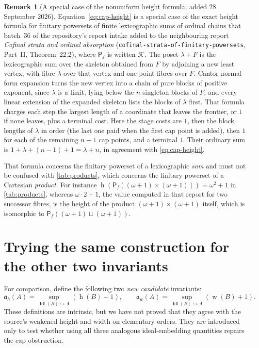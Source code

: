 \documentclass[11pt,letterpaper]{article}
\theoremstyle{teal}
\theoremstyle{definition}
\newtheorem{remark}[theorem]{Remark}
\newcommand{\Pf}{\mathsf P_{\!f}}
\newcommand{\Idl}{\operatorname{Idl}}
\newcommand{\hgt}{\operatorname{h}}
\newcommand{\wid}{\operatorname{w}}
\newcommand{\ah}{\mathfrak a_h}
\newcommand{\aw}{\mathfrak a_w}
\newcommand{\emb}{\hookrightarrow}
\begin{document}
\begin{remark}[A special case of the nonuniform height formula; added 28 September 2026]\label{ioa:rem:nonuniform-heights}
Equation~\eqref{eq:cap-height} is a special case of the exact height formula for finitary powersets of finite lexicographic sums of ordinal chains that batch~36 of the repository's report intake added to the neighbouring report \emph{Cofinal strata and ordinal absorption} (\texttt{cofinal-strata-of-finitary-powersets}, Part~II, Theorem~22.2), where $\Pf$ is written $\mathcal K$. The poset $\lambda+F$ is the lexicographic sum over the skeleton obtained from $F$ by adjoining a new least vertex, with fibre $\lambda$ over that vertex and one-point fibres over $F$. Cantor-normal-form expansion turns the new vertex into a chain of pure blocks of positive exponent, since $\lambda$ is a limit, lying below the $n$ singleton blocks of $F$, and every linear extension of the expanded skeleton lists the blocks of $\lambda$ first. That formula charges each step the largest length of a coordinate that leaves the frontier, or $1$ if none leaves, plus a terminal cost. Here the stage costs are $1$, then the block lengths of $\lambda$ in order (the last one paid when the first cap point is added), then $1$ for each of the remaining $n-1$ cap points, and a terminal $1$. Their ordinary sum is $1+\lambda+(n-1)+1=\lambda+n$, in agreement with \eqref{eq:cap-height}.

That formula concerns the finitary powerset of a lexicographic \emph{sum} and must not be confused with \cref{tab:products}, which concerns the finitary powerset of a Cartesian \emph{product}. For instance $\hgt(\Pf((\omega+1)\times(\omega+1)))=\omega^2+1$ in \cref{tab:products}, whereas $\omega\cdot2+1$, the value computed in that report for two successor fibres, is the height of the product $(\omega+1)\times(\omega+1)$ itself, which is isomorphic to $\Pf((\omega+1)\sqcup(\omega+1))$.
\end{remark}

\section{Trying the same construction for the other two invariants}
For comparison, define the following two \emph{new candidate} invariants:
\[
 \ah(A)=\sup_{\Idl(B)\emb A}(\hgt(B)+1),\qquad
 \aw(A)=\sup_{\Idl(B)\emb A}(\wid(B)+1).
\]
These definitions are intrinsic, but we have not proved that they agree with the source's weakened height and width on elementary orders. They are introduced only to test whether using all three analogous ideal-embedding quantities repairs the cap obstruction.
\end{document}
